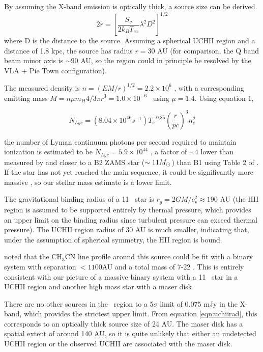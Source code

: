 By assuming the X-band emission is optically thick, a source size can be derived.
\begin{equation}
    \label{eqn:uchiirad}
    2 r = \left[\frac{S_\nu}{2 k_B T_{ex}}  \lambda^2  D^2\right]^{1/2}
\end{equation}
where D is the distance to the source.  Assuming a spherical UCHII region and a
distance of 1.8 kpc, the source has radius $r=$30 AU (for comparison, the
Q band beam minor axis is $\sim$90 AU, so the region could in principle be
resolved by the VLA + Pie Town configuration).  

The measured density is $n=(EM / r)^{1/2} = 2.2\times10^6$ \percc, with a
corresponding emitting mass $M = n \mu m_H 4/3 \pi r^3 = 1.0\times 10^{-6}$
\msun\ using $\mu=1.4$.  Using \citet{kurtz1994} equation 1,

\begin{equation}
  N_{Lyc} = (8.04\times10^{46} s^{-1}) T_e^{-0.85} \left(\frac{r}{pc} \right)^3 n_e^2
\end{equation}

the number of Lyman continuum photons per second required to maintain
ionization is estimated to be  $N_{Lyc} = 5.9\times10^{44}$ 
, a factor of $\sim4$ lower than measured by \citet{beuther2007} and
closer to a B2 ZAMS star ($\sim11M_{\odot}$) than B1 using Table 2 of
\citet{panagia1973}.  If the star has not yet reached the main sequence, it
could be significantly more massive \citep{hosokawa2009}, so our stellar mass
estimate is a lower limit.

The gravitational binding radius of a 11 \msun\ star is $r_g = 2 G M / c_s^2 \approx
190$ AU (the HII region is assumed to be supported entirely by thermal
pressure, which provides an upper limit on the binding radius since turbulent
pressure can exceed thermal pressure).  The UCHII region radius of 30 AU is
much smaller, indicating that, under the assumption of spherical symmetry, the
HII region is bound.

\citet{leurini2007} noted that the CH$_3$CN line profile around this source
could be fit with a binary system with separation $<1100$AU and a total mass
of 7-22 \msun .  This is entirely consistent with our picture of a massive binary
system with a 11 \msun\ star in a UCHII region and another high mass star with
a maser disk.

There are no other sources in the \region\ region to a 5$\sigma$ limit of 0.075
mJy in the X-band, which provides the strictest upper limit.  From equation
\ref{eqn:uchiirad}, this corresponds to an optically thick source size of 24
AU.  The maser disk has a spatial extent of around 140 AU, so it is quite unlikely
that either an undetected UCHII region or the observed UCHII are associated with
the maser disk.

